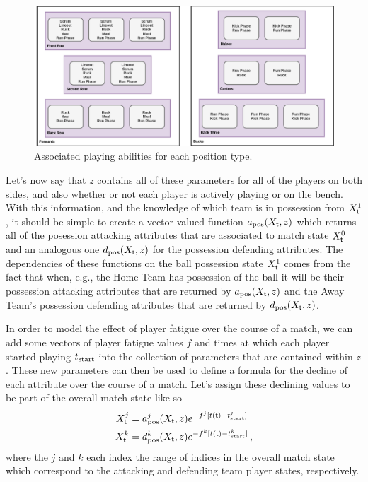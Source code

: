 \begin{figure}[h]
\includegraphics[width=15cm]{images/rugby-player-abilities.drawio.png}
\caption{Associated playing abilities for each position type.}
\label{fig:player-abilities}
\end{figure}

Let's now say that $z$ contains all of these parameters for all of the players on both sides, and also whether or not each player is actively playing or on the bench. With this information, and the knowledge of which team is in possession from $X^1_{\sf t}$, it should be simple to create a vector-valued function $a_{\rm pos}(X_{\sf t}, z)$ which returns all of the posession attacking attributes that are associated to match state $X^0_{\sf t}$ and an analogous one $d_{\rm pos}(X_{\sf t}, z)$ for the possession defending attributes. The dependencies of these functions on the ball possession state $X^1_{\sf t}$ comes from the fact that when, e.g., the {\sf Home Team} has possession of the ball it will be their possession attacking attributes that are returned by $a_{\rm pos}(X_{\sf t}, z)$ and the {\sf Away Team}'s possession defending attributes that are returned by $d_{\rm pos}(X_{\sf t}, z)$.

In order to model the effect of player fatigue over the course of a match, we can add some vectors of player fatigue values $f$ and times at which each player started playing $t_{\rm start}$ into the collection of parameters that are contained within $z$. These new parameters can then be used to define a formula for the decline of each attribute over the course of a match. Let's assign these declining values to be part of the overall match state like so
\begin{align}
X^j_{\sf t} &= a^j_{\rm pos}(X_{\sf t}, z)e^{-f^j[t({\sf t})-t^j_{\rm start}]} \label{eq:att-player-fatigue} \\
X^k_{\sf t} &= d^k_{\rm pos}(X_{\sf t}, z)e^{-f^k[t({\sf t})-t^k_{\rm start}]} \label{eq:def-player-fatigue} \,,
\end{align}
where the $j$ and $k$ each index the range of indices in the overall match state which correspond to the attacking and defending team player states, respectively.

